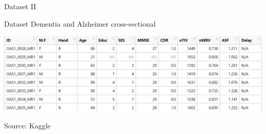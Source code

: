 \documentclass{beamer}
\begin{document}
\begin{frame}{Dataset II}
	
	
	Dataset Dementia and Alzheimer cross-sectional
	\begin{center}%
		
		
		\includegraphics[width=\columnwidth]{dataset_al2.jpeg}
	\end{center}
	
	
	Source: Kaggle
%	

	
	

	
	
	

\end{frame}
\end{document}
